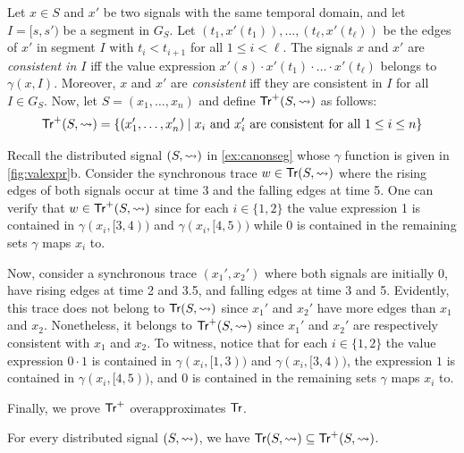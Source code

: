 Let $x \in S$ and $x'$ be two signals with the same temporal domain, and let $I = [s, s')$ be a segment in $G_S$.
Let $(t_1, x'(t_1)), \ldots, (t_\ell, x'(t_\ell))$ be the edges of $x'$ in segment $I$ with $t_i < t_{i+1}$ for all $1 \leq i < \ell$.
The signals $x$ and $x'$ are \emph{consistent in $I$} iff the value expression $x'(s) \cdot x'(t_1) \cdot \ldots \cdot x'(t_\ell)$ belongs to $\gamma(x,I)$.
Moreover, $x$ and $x'$ are \emph{consistent} iff they are consistent in $I$ for all $I \in G_S$.
Now, let $S = (x_1, \ldots, x_n)$ and define $\mathsf{Tr}^+(S,{\rightsquigarrow})$ as follows:
\[ \tr^+(S,{\hb}) = \{ (x_1', \ldots, x_n') \st \text{$x_i$ and $x_i'$ are consistent for all $1 \leq i \leq n$}\} \]



\begin{example} \label{ex:overapx}
	Recall the distributed signal $(S, {\rightsquigarrow})$ in \cref{ex:canonseg} whose $\gamma$ function is given in \cref{fig:valexpr}b.
	Consider the synchronous trace $w \in \mathsf{Tr}(S, {\rightsquigarrow})$ where the rising edges of both signals occur at time 3 and the falling edges at time 5.
	One can verify that $w \in \mathsf{Tr}^+(S,{\rightsquigarrow})$ since for each $i \in \{1,2\}$ the value expression 1 is contained in $\gamma(x_i, [3,4))$ and $\gamma(x_i, [4,5))$ while 0 is contained in the remaining sets $\gamma$ maps $x_i$ to.
	
	Now, consider a synchronous trace $(x_1', x_2')$ where both signals are initially 0, have rising edges at time 2 and 3.5, and falling edges at time 3 and 5.
	Evidently, this trace does not belong to $\mathsf{Tr}(S, {\rightsquigarrow})$ since $x_1'$ and $x_2'$ have more edges than $x_1$ and $x_2$.
	Nonetheless, it belongs to $\mathsf{Tr}^+(S,{\rightsquigarrow})$ since $x_1'$ and $x_2'$ are respectively consistent with $x_1$ and $x_2$.
	To witness, notice that for each $i \in \{1,2\}$ the value expression $0 \cdot 1$ is contained in $\gamma(x_i, [1,3))$ and $\gamma(x_i, [3,4))$, the expression $1$ is contained in $\gamma(x_i, [4,5))$, and 0 is contained in the remaining sets $\gamma$ maps $x_i$ to.
\end{example}

Finally, we prove $\mathsf{Tr}^+$ overapproximates $\mathsf{Tr}$.

\begin{lemma} \label{cl:trsound}
	For every distributed signal $(S,{\rightsquigarrow})$, we have $\mathsf{Tr}(S,{\rightsquigarrow}) \subseteq \mathsf{Tr}^+(S,{\rightsquigarrow})$.
\end{lemma}

